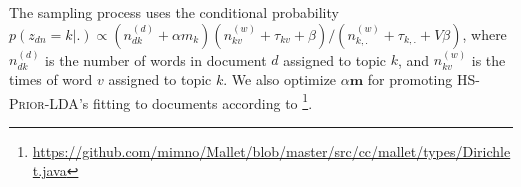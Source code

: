 \documentclass{article}
\begin{document}
The sampling process uses the conditional probability \(p(z_{dn}=k|.)\propto (n^{(d)}_{dk}+\alpha m_k)(n^{(w)}_{kv}+\tau_{kv}+\beta)/(n^{(w)}_{k,.}+\tau_{k,.}+V\beta)\), where \(n^{(d)}_{dk}\) is the number of words in document \(d\) assigned to topic \(k\), and \(n^{(w)}_{kv}\) is the times of word \(v\) assigned to topic \(k\).
We also optimize \(\alpha \bm{m}\) for promoting \textsc{HS-Prior-LDA}'s fitting to documents according to \cite{wallach2008structured}\footnote{\url{https://github.com/mimno/Mallet/blob/master/src/cc/mallet/types/Dirichlet.java}}.

\end{document}
